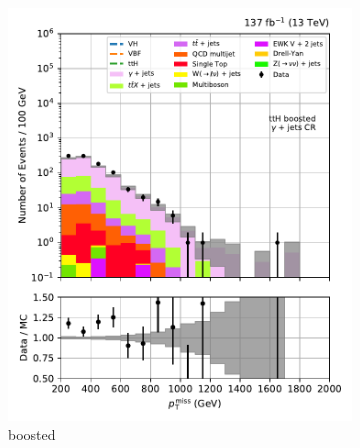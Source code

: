 \begin{figure}[htbp]
    \centering
    \begin{subfigure}[b]{0.24\textwidth}
        \includegraphics[width=\textwidth]{figures/region_plots/full_Run2/region_5/ttH_boosted.pdf}
        \caption{\ttH boosted}
    \end{subfigure}
    \hfill
    \begin{subfigure}[b]{0.24\textwidth}

\end{subfigure}
\end{figure}
